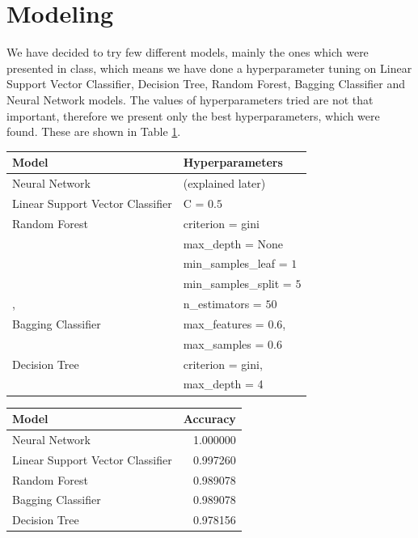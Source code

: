 \documentclass[12pt,a4paper]{article}
\begin{document}
\section{Modeling}

We have decided to try few different models, mainly the ones which were presented in class,
which means we have done a hyperparameter tuning on
Linear Support Vector Classifier, Decision Tree, Random Forest, Bagging Classifier and Neural Network models.
The values of hyperparameters tried are not that important,
therefore we present only the best hyperparameters, which were found.
These are shown in Table \ref{tbl:hyperparameters}.

\begin{table}[h]
	\centering
	\begin{tabular}{|l|l|}
		\hline
		\textbf{Model} &  \textbf{Hyperparameters} \\
		\hline
		Neural Network & (explained later) \\
		\hline
		Linear Support Vector Classifier & C = $0.5$ \\
		\hline
		Random Forest & criterion = gini \\
		              & max\_depth = None \\
		              & min\_samples\_leaf = $1$ \\
		              & min\_samples\_split = $5$ \\,
		              & n\_estimators = $50$ \\
		\hline
		Bagging Classifier & max\_features = $0.6$, \\
		                   & max\_samples = $0.6$ \\
		\hline
		Decision Tree & criterion = gini, \\
		              & max\_depth = 4 \\
		\hline
	\end{tabular}
	\label{tbl:hyperparameters}
\end{table}



\begin{table}[h]
	\centering
\begin{tabular}{|l|r|}
	\hline
	           \textbf{Model} &  \textbf{Accuracy} \\
	\hline
	  Neural Network &  1.000000 \\
	Linear Support Vector Classifier &  0.997260 \\
	   Random Forest &  0.989078 \\
	         Bagging Classifier &  0.989078 \\
	           Decision Tree &  0.978156 \\
	\hline
\end{tabular}
\label{tbl:accuracies}
\end{table}
\end{document}
